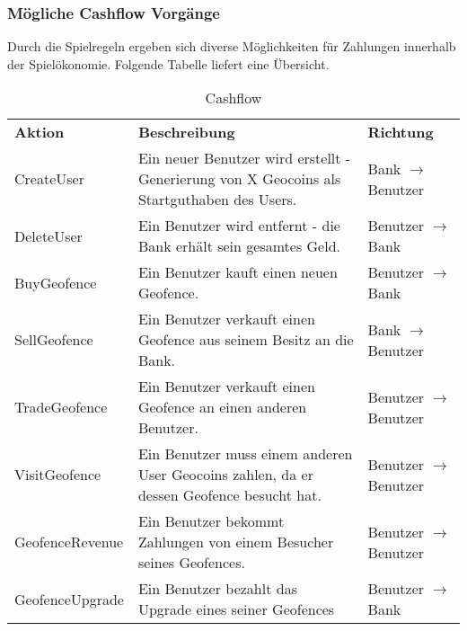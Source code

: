 \documentclass{scrreprt}
\begin{document}
\subsubsection{Mögliche Cashflow Vorgänge}
Durch die Spielregeln ergeben sich diverse Möglichkeiten für Zahlungen innerhalb der Spielökonomie. Folgende Tabelle liefert eine Übersicht.
\begin{table}[h]
     \centering
     \begin{tabular}{l|p{8cm}|l}
		\textbf{Aktion}	&	\textbf{Beschreibung}	&	\textbf{Richtung} \\
       CreateUser          & Ein neuer Benutzer wird erstellt - Generierung von X Geocoins als Startguthaben des Users.  &   Bank $\rightarrow$ Benutzer       \\
       \hline
           DeleteUser        & Ein Benutzer wird entfernt - die Bank erhält sein gesamtes Geld.   &  Benutzer $\rightarrow$ Bank       \\
       \hline
       BuyGeofence       & Ein Benutzer kauft einen neuen Geofence.   &  Benutzer $\rightarrow$ Bank        \\
       \hline
       SellGeofence        & Ein Benutzer verkauft einen Geofence aus seinem Besitz an die Bank.   & Bank $\rightarrow$ Benutzer        \\
       \hline
       TradeGeofence        & Ein Benutzer verkauft einen Geofence an einen anderen Benutzer.   &     Benutzer $\rightarrow$ Benutzer    \\
       \hline
        VisitGeofence        & Ein Benutzer muss einem anderen User Geocoins zahlen, da er dessen Geofence besucht hat.   &   Benutzer $\rightarrow$ Benutzer      \\
       \hline
         GeofenceRevenue        & Ein Benutzer bekommt Zahlungen von einem Besucher seines Geofences.   &    Benutzer $\rightarrow$ Benutzer     \\
       \hline
         GeofenceUpgrade        & Ein Benutzer bezahlt das Upgrade eines seiner Geofences   &  Benutzer $\rightarrow$ Bank       \\

     \end{tabular}

     \caption{Cashflow}
     \label{tbl:beispieltabelle}

   \end{table}
\end{document}
